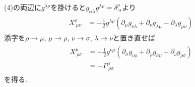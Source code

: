 \documentclass[uplatex,a4j,11pt,dvipdfmx]{jsarticle}
\begin{document}
(4)の両辺に$g^{\lambda\rho}$を掛けると$g_{\alpha\lambda}g^{\lambda\rho}=\delta^\rho_{\ \alpha}$より
\begin{align}
  \begin{split}
    X^{\rho}_{\ \mu\nu}&=-\frac{1}{2}g^{\lambda\rho}(\partial_\mu g_{\nu\lambda}+\partial_\nu g_{\lambda\mu}-\partial_\lambda g_{\mu\nu})
  \end{split}
\end{align}
添字を$\rho\rightarrow\mu$, $\mu\rightarrow\rho$, $\nu\rightarrow\sigma$, $\lambda\rightarrow\nu$と置き直せば
\begin{align}
  \begin{split}
    X^\mu_{\ \rho\sigma}&=-\frac{1}{2}g^{\nu\mu}(\partial_\sigma g_{\nu\rho}+\partial_\rho g_{\sigma\nu}-\partial_\nu g_{\rho\sigma})\\
    &=-\Gamma^\mu_{\ \rho\sigma}
  \end{split}
\end{align}
を得る.
\end{document}
